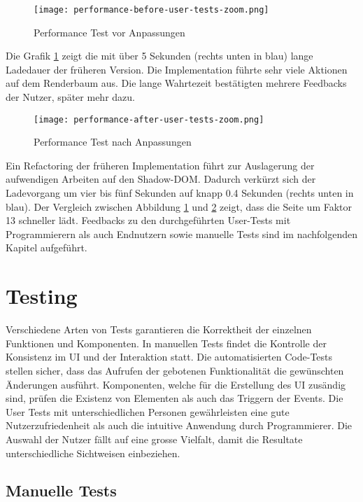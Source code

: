 \begin{figure}[!htb]
    \centering
    \texttt{[image: performance-before-user-tests-zoom.png]}
    \caption{\centering Performance Test vor Anpassungen}
    \label{img:performanceTestBefore}
\end{figure}

Die Grafik \ref{img:performanceTestBefore} zeigt die mit über 5 Sekunden (rechts unten in blau) lange Ladedauer der früheren Version. 
Die Implementation führte sehr viele Aktionen auf dem Renderbaum aus. 
Die lange Wahrtezeit bestätigten mehrere Feedbacks der Nutzer, später mehr dazu. 

\begin{figure}[!htb]
    \centering
    \texttt{[image: performance-after-user-tests-zoom.png]}
    \caption{\centering Performance Test nach Anpassungen}
    \label{img:performanceTestAfter}
\end{figure}

Ein Refactoring der früheren Implementation führt zur Auslagerung der aufwendigen Arbeiten auf den Shadow-DOM. 
Dadurch verkürzt sich der Ladevorgang um vier bis fünf Sekunden auf knapp 0.4 Sekunden (rechts unten in blau). 
Der Vergleich zwischen Abbildung \ref{img:performanceTestBefore} und \ref{img:performanceTestAfter} zeigt, dass die Seite um Faktor 13 schneller lädt. 
Feedbacks zu den durchgeführten User-Tests mit Programmierern als auch Endnutzern sowie manuelle Tests sind im nachfolgenden Kapitel aufgeführt. 


\section{Testing}
\label{sec:testing}

Verschiedene Arten von Tests garantieren die Korrektheit der einzelnen Funktionen und Komponenten. 
In manuellen Tests findet die Kontrolle der Konsistenz im UI und der Interaktion statt. 
Die automatisierten Code-Tests stellen sicher, dass das Aufrufen der gebotenen Funktionalität die gewünschten Änderungen ausführt. 
Komponenten, welche für die Erstellung des UI zusändig sind, prüfen die Existenz von Elementen als auch das Triggern der Events. 
Die User Tests mit unterschiedlichen Personen gewährleisten eine gute Nutzerzufriedenheit als auch die intuitive Anwendung durch Programmierer. 
Die Auswahl der Nutzer fällt auf eine grosse Vielfalt, damit die Resultate unterschiedliche Sichtweisen einbeziehen. 


\subsection{Manuelle Tests}
\label{sec:manuelTests}

